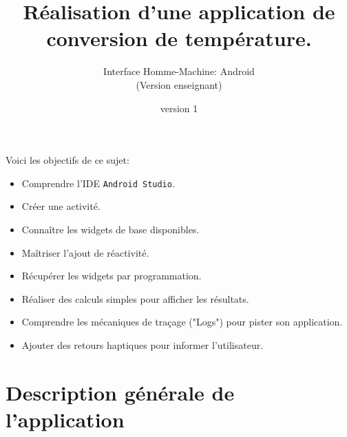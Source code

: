 \documentclass[a4paper,10pt]{article}
\newenvironment{attention}%
{\begin{tcolorbox}[breakable,colback=green!25!white,colframe=red!55!black,title=Attention]}%
{\end{tcolorbox}}
\begin{document}
	


\title{\vspace*{-1cm}Réalisation d'une application de conversion de température.}
\author{\vspace*{-1.5cm}Interface Homme-Machine: Android
\begin{ensnote}
	(Version enseignant)
\end{ensnote}
}
\date{\vspace*{-1.5cm}version 1}
\maketitle
\thispagestyle{fancy}

Voici les objectifs de ce sujet:
\begin{itemize}
	\item Comprendre l'IDE \texttt{Android Studio}.
	\item Créer une activité.
	\item Connaître les widgets de base disponibles.
	\item Maîtriser l'ajout de réactivité.
	\item Récupérer les widgets par programmation.
	\item Réaliser des calculs simples pour afficher les résultats.
	\item Comprendre les mécaniques de traçage ("Logs") pour pister son application.
	\item Ajouter des retours haptiques pour informer l'utilisateur.
\end{itemize}


%	

\section*{Description générale de l'application}
\end{document}
